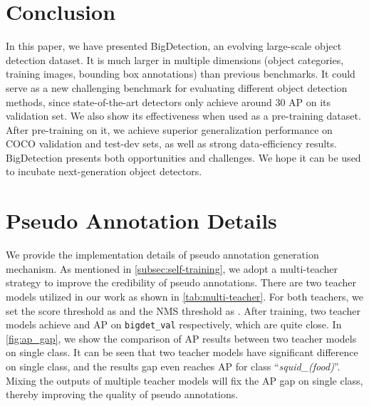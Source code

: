 \documentclass[10pt,twocolumn,letterpaper]{article}
\begin{document}
 
\section{Conclusion}
\label{sec:conclusion}
In this paper, we have presented BigDetection, an evolving large-scale object detection dataset. 
It is much larger in multiple dimensions (object categories, training images, bounding box annotations) than previous benchmarks. It could serve as a new challenging benchmark for evaluating different object detection methods, since state-of-the-art detectors only achieve around 30 AP on its validation set. We also show its effectiveness when used as a pre-training dataset. After pre-training on it, we achieve superior generalization performance on COCO validation and test-dev sets, as well as strong data-efficiency results. BigDetection presents both opportunities and challenges. We hope it can be used to incubate next-generation object detectors. 

 
{\small


}

\clearpage
\appendix

\section{Pseudo Annotation Details}
\label{app:pseudo_anno}
We provide the implementation details of pseudo annotation generation mechanism. 
As mentioned in \cref{subsec:self-training}, we adopt a multi-teacher strategy to improve the credibility of pseudo annotations. 
There are two teacher models utilized in our work as shown in \cref{tab:multi-teacher}. For both teachers, we set the score threshold as  and the NMS threshold as . 
After training, two teacher models achieve  and  AP on \verb+bigdet_val+ respectively, which are quite close. 
In \cref{fig:ap_gap}, we show the comparison of AP results between two teacher models on single class. 
It can be seen that two teacher models have significant difference on single class, and the results gap even reaches  AP for class ``\textit{squid\_(food)}''. 
Mixing the outputs of multiple teacher models will fix the AP gap on single class, thereby improving the quality of pseudo annotations.
\end{document}
